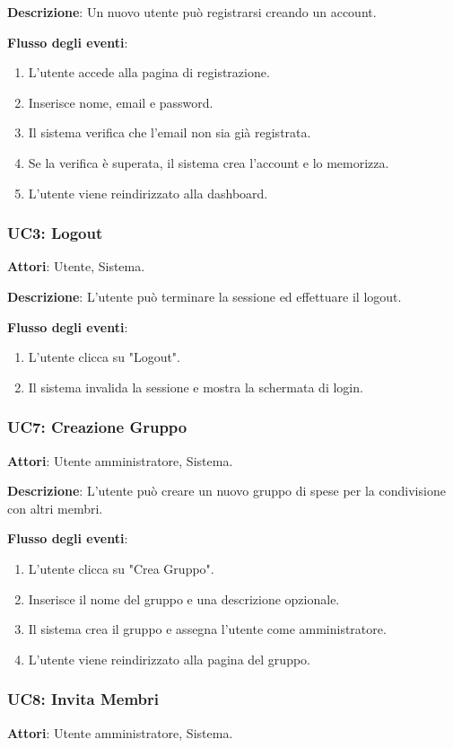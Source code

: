 \textbf{Descrizione}: Un nuovo utente può registrarsi creando un account.

\textbf{Flusso degli eventi}:
\begin{enumerate}
    \item L'utente accede alla pagina di registrazione.
    \item Inserisce nome, email e password.
    \item Il sistema verifica che l’email non sia già registrata.
    \item Se la verifica è superata, il sistema crea l’account e lo memorizza.
    \item L'utente viene reindirizzato alla dashboard.
\end{enumerate}

\subsubsection{UC3: Logout}
\textbf{Attori}: Utente, Sistema.

\textbf{Descrizione}: L'utente può terminare la sessione ed effettuare il logout.

\textbf{Flusso degli eventi}:
\begin{enumerate}
    \item L'utente clicca su "Logout".
    \item Il sistema invalida la sessione e mostra la schermata di login.
\end{enumerate}

\subsubsection{UC7: Creazione Gruppo}
\textbf{Attori}: Utente amministratore, Sistema.

\textbf{Descrizione}: L’utente può creare un nuovo gruppo di spese per la condivisione con altri membri.

\textbf{Flusso degli eventi}:
\begin{enumerate}
    \item L’utente clicca su "Crea Gruppo".
    \item Inserisce il nome del gruppo e una descrizione opzionale.
    \item Il sistema crea il gruppo e assegna l’utente come amministratore.
    \item L'utente viene reindirizzato alla pagina del gruppo.
\end{enumerate}

\subsubsection{UC8: Invita Membri}
\textbf{Attori}: Utente amministratore, Sistema.

